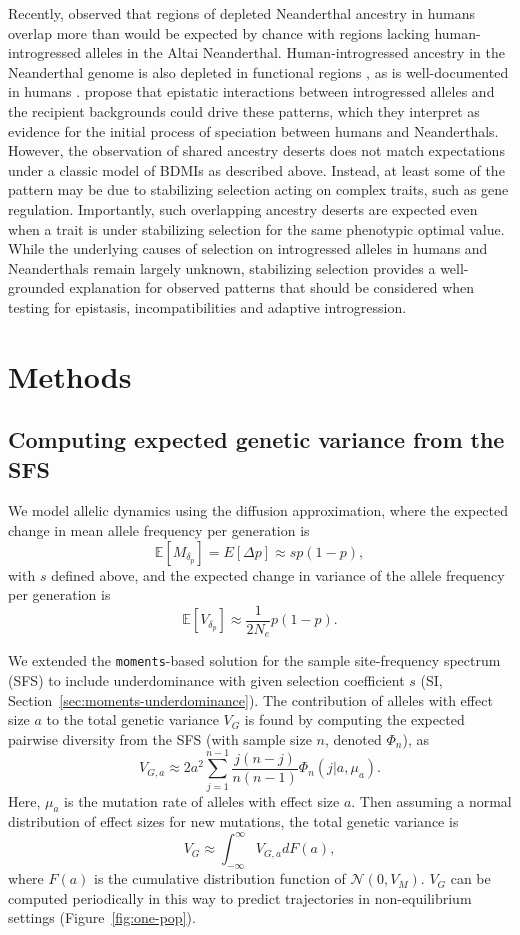 \documentclass{article}
\newcommand{\E}{\mathbb{E}}
\newcommand{\moments}{\texttt{moments}\xspace}
\begin{document}
Recently, \citet{harris2023diverse} observed that regions of depleted Neanderthal
ancestry in humans overlap more than would be expected by chance with regions
lacking human-introgressed alleles in the Altai Neanderthal.
Human-introgressed ancestry in the Neanderthal genome is also depleted in
functional regions \citep{harris2023diverse}, as is well-documented in humans
\citep{sankararaman2014genomic, sankararaman2016combined}.
\citet{harris2023diverse} propose that epistatic interactions between
introgressed alleles and the recipient backgrounds could drive these patterns,
which they interpret as evidence for the initial process of speciation between
humans and Neanderthals. However, the observation of shared ancestry deserts
does not match expectations under a classic model of BDMIs as described above.
Instead, at least some of the pattern may be due to stabilizing selection
acting on complex traits, such as gene regulation. Importantly, such
overlapping ancestry deserts are expected even when a trait is under
stabilizing selection for the same phenotypic optimal value. While the
underlying causes of selection on introgressed alleles in humans and
Neanderthals remain largely unknown, stabilizing selection provides a
well-grounded explanation for observed patterns that should be considered when
testing for epistasis, incompatibilities and adaptive introgression.

\section*{Methods}

\subsection*{Computing expected genetic variance from the SFS}

We model allelic dynamics using the diffusion approximation, where the expected
change in mean allele frequency per generation is
\[\E[M_{\delta_p}] = E[\Delta p] \approx s p(1-p),\]
with $s$ defined above, and the expected change in variance of the allele frequency per
generation is
\[\E[V_{\delta_p}] \approx \frac{1}{2N_e}p(1-p).\]


We extended the \moments-based solution for the sample site-frequency spectrum
(SFS) \citep{jouganous2017inferring} to include underdominance with given
selection coefficient $s$ (SI, Section~\ref{sec:moments-underdominance}). The
contribution of alleles with effect size $a$ to the total genetic variance
$V_G$ is found by computing the expected pairwise diversity from the SFS (with
sample size $n$, denoted $\Phi_n$), as
\[V_{G,a} \approx 2a^2\sum_{j=1}^{n-1} \frac{j(n-j)}{n(n-1)} \Phi_n(j|a,\mu_a).\]
Here, $\mu_a$ is the mutation rate of alleles with effect size $a$. Then
assuming a normal distribution of effect sizes for new mutations, the total
genetic variance is
\[V_G \approx \int_{-\infty}^\infty V_{G,a} dF(a),\]
where \(F(a)\) is the cumulative distribution function of \(\mathcal{N}(0,V_M)\).
$V_G$ can be computed periodically in this way to predict trajectories in
non-equilibrium settings (Figure~\ref{fig:one-pop}).
\end{document}
